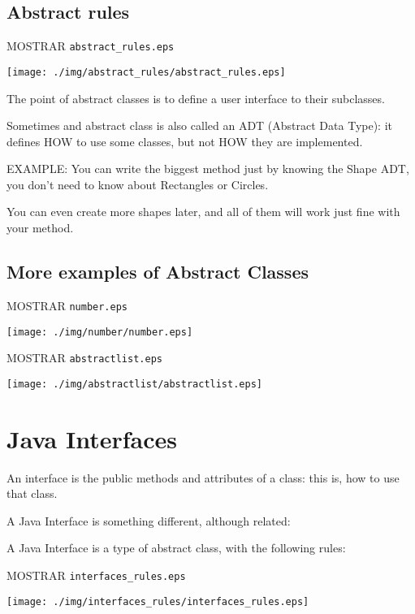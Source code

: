 \documentclass[a4paper, 9pt]{extarticle}
\begin{document}
\subsection{Abstract rules}

MOSTRAR \verb+abstract_rules.eps+
\begin{center}
  \texttt{[image: ./img/abstract\_rules/abstract\_rules.eps]}
\end{center}

The point of abstract classes is to define a user interface to their subclasses.

Sometimes and abstract class is also called an ADT (Abstract Data Type): it
defines HOW to use some classes, but not HOW they are implemented.

EXAMPLE: You can write the biggest method just by knowing the Shape ADT, you
don't need to know about Rectangles or Circles.

You can even create more shapes later, and all of them will work just fine with
your method.




\subsection{More examples of Abstract Classes}

MOSTRAR \verb+number.eps+
\begin{center}
  \texttt{[image: ./img/number/number.eps]}
\end{center}

MOSTRAR \verb+abstractlist.eps+
\begin{center}
  \texttt{[image: ./img/abstractlist/abstractlist.eps]}
\end{center}


\section{Java Interfaces}

An interface is the public methods and attributes of a class: this is, how to
use that class.

A Java Interface is something different, although related:

A Java Interface is a type of abstract class, with the following rules:

MOSTRAR \verb+interfaces_rules.eps+
\begin{center}
  \texttt{[image: ./img/interfaces\_rules/interfaces\_rules.eps]}
\end{center}
\end{document}
